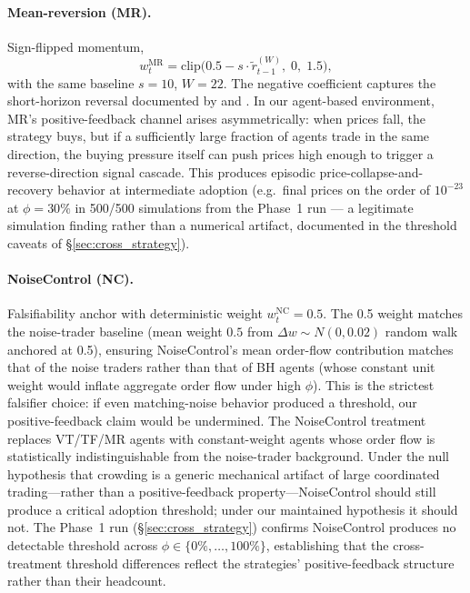 \documentclass[12pt,a4paper]{article}
\begin{document}
\paragraph{Mean-reversion (MR).} Sign-flipped momentum,
\begin{equation}
  w_t^{\text{MR}} = \mathrm{clip}\!\bigl(0.5 - s \cdot \tilde{r}^{(W)}_{t-1},\; 0,\; 1.5\bigr),
  \label{eq:mr_rule}
\end{equation}
with the same baseline $s = 10$, $W = 22$. The negative coefficient captures the short-horizon reversal documented by \citet{lehmann1990} and \citet{lo1990}. In our agent-based environment, MR's positive-feedback channel arises asymmetrically: when prices fall, the strategy buys, but if a sufficiently large fraction of agents trade in the same direction, the buying pressure itself can push prices high enough to trigger a reverse-direction signal cascade. This produces episodic price-collapse-and-recovery behavior at intermediate adoption (e.g.\ final prices on the order of $10^{-23}$ at $\phi = 30\%$ in 500/500 simulations from the Phase~1 run --- a legitimate simulation finding rather than a numerical artifact, documented in the threshold caveats of \S\ref{sec:cross_strategy}).

\paragraph{NoiseControl (NC).} Falsifiability anchor with deterministic weight $w^{\text{NC}}_t = 0.5$. The 0.5 weight matches the noise-trader baseline (mean weight $0.5$ from $\Delta w \sim N(0, 0.02)$ random walk anchored at 0.5), ensuring NoiseControl's mean order-flow contribution matches that of the noise traders rather than that of BH agents (whose constant unit weight would inflate aggregate order flow under high $\phi$). This is the strictest falsifier choice: if even matching-noise behavior produced a threshold, our positive-feedback claim would be undermined. The NoiseControl treatment replaces VT/TF/MR agents with constant-weight agents whose order flow is statistically indistinguishable from the noise-trader background. Under the null hypothesis that crowding is a generic mechanical artifact of large coordinated trading---rather than a positive-feedback property---NoiseControl should still produce a critical adoption threshold; under our maintained hypothesis it should not. The Phase~1 run (\S\ref{sec:cross_strategy}) confirms NoiseControl produces no detectable threshold across $\phi \in \{0\%, \ldots, 100\%\}$, establishing that the cross-treatment threshold differences reflect the strategies' positive-feedback structure rather than their headcount.
\end{document}
